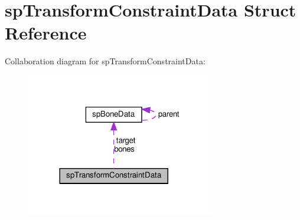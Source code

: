 \hypertarget{structspTransformConstraintData}{}\section{sp\+Transform\+Constraint\+Data Struct Reference}
\label{structspTransformConstraintData}


Collaboration diagram for sp\+Transform\+Constraint\+Data\+:
\nopagebreak
\begin{figure}[H]
\begin{center}
\leavevmode
\includegraphics[width=233pt]{structspTransformConstraintData__coll__graph}
\end{center}
\end{figure}
